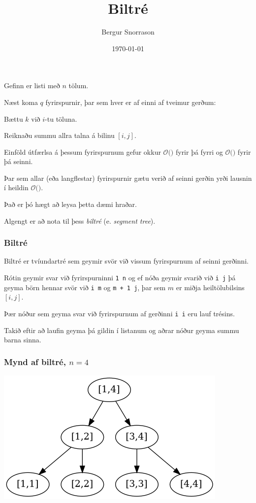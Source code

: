 \title{Biltré}
\author{Bergur Snorrason}
\date{\today}



\frame{\titlepage}

{
	{
		\item<1-> Gefinn er listi með $n$ tölum.
		\item<2-> Næst koma $q$ fyrirspurnir, þar sem hver er af einni af tveimur gerðum:
		{
			\item<3-> Bættu $k$ við $i$-tu töluna.
			\item<4-> Reiknaðu summu allra talna á bilinu $[i, j]$.
		}
		\item<5-> Einföld útfærlsa á þessum fyrirspurnum gefur okkur
					$\mathcal{O}($$)$ fyrir þá fyrri og
					$\mathcal{O}($$)$ fyrir þá seinni.
		\item<8-> Þar sem allar (eða langflestar) fyrirspurnir gætu verið af seinni gerðin yrði lausnin í heildin 
					$\mathcal{O}($\onslide<9->{$qn$}$)$.
		\item<10-> Það er þó hægt að leysa þetta dæmi hraðar.
		\item<11-> Algengt er að nota til þess \emph{biltré} (e. \emph{segment tree}).
	}
}

{
	\frametitle{Biltré}
	{
		\item<1-> Biltré er tvíundartré sem geymir svör við vissum fyrirspurnum af seinni gerðinni.
		\item<2-> Rótin geymir svar við fyrirspurninni \texttt{1 n} 
					og ef nóða geymir svarið við \texttt{i j} þá geyma börn hennar svör við \texttt{i m}
					og \texttt{m + 1 j}, þar sem $m$ er miðja heiltölubilsins $[i, j]$.
		\item<3-> Þær nóður sem geyma svar við fyrirspurnum af gerðinni \texttt{i i} eru lauf trésins.
		\item<4-> Takið eftir að laufin geyma þá gildin í listanum og aðrar nóður geyma summu barna sinna.
	}
}

{
	\frametitle{Mynd af biltré, $n = 4$}
	{
		\includegraphics[scale=0.5]{fig/mynd2.png}
	}
}

